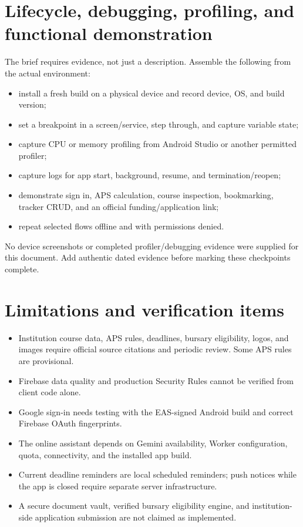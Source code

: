 \documentclass[11pt,a4paper]{article}
\begin{document}
\section{Lifecycle, debugging, profiling, and functional demonstration}
The brief requires evidence, not just a description. Assemble the following from the actual environment:
\begin{itemize}
\item install a fresh build on a physical device and record device, OS, and build version;
\item set a breakpoint in a screen/service, step through, and capture variable state;
\item capture CPU or memory profiling from Android Studio or another permitted profiler;
\item capture logs for app start, background, resume, and termination/reopen;
\item demonstrate sign in, APS calculation, course inspection, bookmarking, tracker CRUD, and an official funding/application link;
\item repeat selected flows offline and with permissions denied.
\end{itemize}
No device screenshots or completed profiler/debugging evidence were supplied for this document. Add authentic dated evidence before marking these checkpoints complete.

\section{Limitations and verification items}
\begin{itemize}
\item Institution course data, APS rules, deadlines, bursary eligibility, logos, and images require official source citations and periodic review. Some APS rules are provisional.
\item Firebase data quality and production Security Rules cannot be verified from client code alone.
\item Google sign-in needs testing with the EAS-signed Android build and correct Firebase OAuth fingerprints.
\item The online assistant depends on Gemini availability, Worker configuration, quota, connectivity, and the installed app build.
\item Current deadline reminders are local scheduled reminders; push notices while the app is closed require separate server infrastructure.
\item A secure document vault, verified bursary eligibility engine, and institution-side application submission are not claimed as implemented.
\end{itemize}
\end{document}

